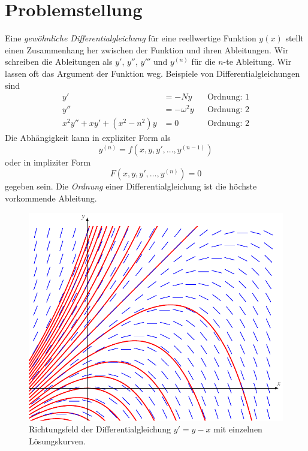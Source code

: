 %
%
%
\section{Problemstellung
\label{buch:section:dglproblemstellung}}
Eine {\em gewöhnliche Differentialgleichung} für eine reellwertige
%
Funktion $y(x)$ stellt einen Zusammenhang her zwischen der Funktion
und ihren Ableitungen.
%
%
Wir schreiben die Ableitungen als $y'$, $y''$, $y'''$ und $y^{(n)}$
für die $n$-te Ableitung.
Wir lassen oft das Argument der Funktion weg.
Beispiele von Differentialgleichungen sind
\begin{align*}
y'&=-Ny
&&\text{Ordnung: $1$}
\\
y''&=-\omega^2 y
&&\text{Ordnung: $2$}
\\
x^2y''+xy'+(x^2-n^2)y&=0
&&\text{Ordnung: $2$}
\end{align*}
Die Abhängigkeit kann in expliziter Form als
%
%
\begin{equation}
y^{(n)}=f(x,y,y',\dots,y^{(n-1)})
\label{grundlagen:explizit}
\end{equation}
oder in impliziter Form
%
%
\[
F(x,y,y',\dots,y^{(n)})=0
\]
gegeben sein.
Die {\em Ordnung} einer Differentialgleichung ist die höchste vorkommende
Ableitung.
%

\begin{figure}
\centering
\includegraphics{chapters/50-ode/figures/grundlagen.pdf}
\caption{Richtungsfeld der Differentialgleichung $y'=y-x$ mit
einzelnen Lösungskurven.
\label{grundlagen:richtungsfeld}}
\end{figure}%


